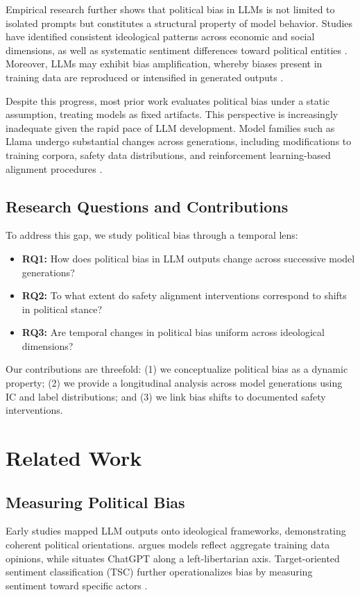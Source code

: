 \documentclass[11pt]{article}
\begin{document}
Empirical research further shows that political bias in LLMs is not limited to isolated prompts but constitutes a structural property of model behavior. Studies have identified consistent ideological patterns across economic and social dimensions, as well as systematic sentiment differences toward political entities \citep{hartmann2023,bang2024}. Moreover, LLMs may exhibit bias amplification, whereby biases present in training data are reproduced or intensified in generated outputs \citep{zhu2024}.

Despite this progress, most prior work evaluates political bias under a static assumption, treating models as fixed artifacts. This perspective is increasingly inadequate given the rapid pace of LLM development. Model families such as Llama undergo substantial changes across generations, including modifications to training corpora, safety data distributions, and reinforcement learning-based alignment procedures \citep{touvron2023,dubey2024}.

\subsection{Research Questions and Contributions}

To address this gap, we study political bias through a temporal lens:
\begin{itemize}
  \item \textbf{RQ1:} How does political bias in LLM outputs change across successive model generations?
  \item \textbf{RQ2:} To what extent do safety alignment interventions correspond to shifts in political stance?
  \item \textbf{RQ3:} Are temporal changes in political bias uniform across ideological dimensions?
\end{itemize}

Our contributions are threefold: (1) we conceptualize political bias as a dynamic property; (2) we provide a longitudinal analysis across model generations using IC and label distributions; and (3) we link bias shifts to documented safety interventions.

\section{Related Work}

\subsection{Measuring Political Bias}
Early studies mapped LLM outputs onto ideological frameworks, demonstrating coherent political orientations. \citet{santurkar2023} argues models reflect aggregate training data opinions, while \citet{hartmann2023} situates ChatGPT along a left-libertarian axis. Target-oriented sentiment classification (TSC) further operationalizes bias by measuring sentiment toward specific actors \citep{wang2025,chen2024}.
\end{document}
